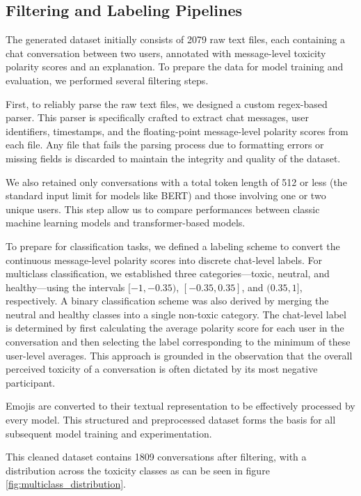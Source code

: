 \documentclass[twocolumn]{ceurart}
\begin{document}
\subsection{Filtering and Labeling Pipelines}

The generated dataset initially consists of 2079 raw text files, each containing a chat conversation between two users, annotated with message-level toxicity polarity scores and an explanation. To prepare the data for model training and evaluation, we performed several filtering steps.

First, to reliably parse the raw text files, we designed a custom regex-based parser. This parser is specifically crafted to extract chat messages, user identifiers, timestamps, and the floating-point message-level polarity scores from each file. Any file that fails the parsing process due to formatting errors or missing fields is discarded to maintain the integrity and quality of the dataset.

We also retained only conversations with a total token length of 512 or less (the standard input limit for models like BERT) and those involving one or two unique users. This step allow us to compare performances between classic machine learning models and transformer-based models.

To prepare for classification tasks, we defined a labeling scheme to convert the continuous message-level polarity scores into discrete chat-level labels. For multiclass classification, we established three categories—toxic, neutral, and healthy—using the intervals $[-1, -0.35)$, $[-0.35, 0.35]$, and $(0.35, 1]$, respectively. A binary classification scheme was also derived by merging the neutral and healthy classes into a single non-toxic category. The chat-level label is determined by first calculating the average polarity score for each user in the conversation and then selecting the label corresponding to the minimum of these user-level averages. This approach is grounded in the observation that the overall perceived toxicity of a conversation is often dictated by its most negative participant.

Emojis are converted to their textual representation to be effectively processed by every model. This structured and preprocessed dataset forms the basis for all subsequent model training and experimentation.

This cleaned dataset contains 1809 conversations after filtering, with a distribution across the toxicity classes as can be seen in figure \ref{fig:multiclass_distribution}.
\end{document}
